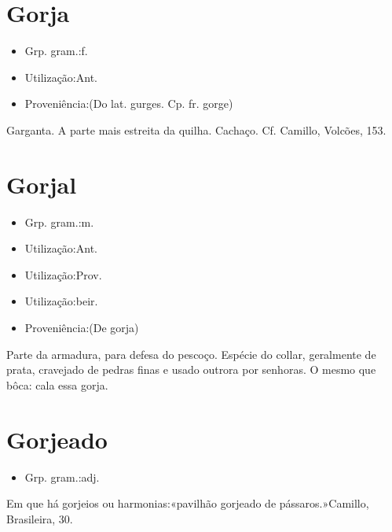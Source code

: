 \section{Gorja}
\begin{itemize}
\item {Grp. gram.:f.}
\end{itemize}
\begin{itemize}
\item {Utilização:Ant.}
\end{itemize}
\begin{itemize}
\item {Proveniência:(Do lat. \textunderscore gurges\textunderscore . Cp. fr. \textunderscore gorge\textunderscore )}
\end{itemize}
Garganta.
A parte mais estreita da quilha.
Cachaço. Cf. Camillo, \textunderscore Volcões\textunderscore , 153.
\section{Gorjal}
\begin{itemize}
\item {Grp. gram.:m.}
\end{itemize}
\begin{itemize}
\item {Utilização:Ant.}
\end{itemize}
\begin{itemize}
\item {Utilização:Prov.}
\end{itemize}
\begin{itemize}
\item {Utilização:beir.}
\end{itemize}
\begin{itemize}
\item {Proveniência:(De \textunderscore gorja\textunderscore )}
\end{itemize}
Parte da armadura, para defesa do pescoço.
Espécie do collar, geralmente de prata, cravejado de pedras finas e usado outrora por senhoras.
O mesmo que \textunderscore bôca\textunderscore : \textunderscore cala essa gorja\textunderscore .
\section{Gorjeado}
\begin{itemize}
\item {Grp. gram.:adj.}
\end{itemize}
Em que há gorjeios ou harmonias:«\textunderscore pavilhão gorjeado de pássaros.\textunderscore »Camillo, \textunderscore Brasileira\textunderscore , 30.
